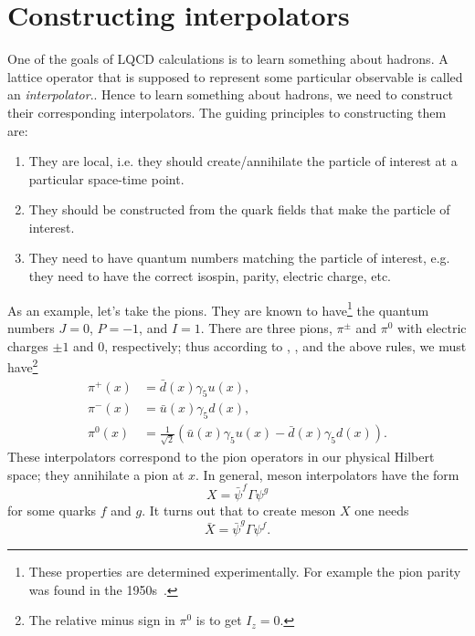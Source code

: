 \section{Constructing interpolators}

One of the goals of LQCD calculations is to learn something about hadrons. A
lattice operator that is supposed to represent some particular observable is
called an {\it interpolator}.. Hence to learn something
about hadrons, we need to construct their corresponding interpolators. The
guiding principles to constructing them are:
\begin{enumerate}
  \item They are local, i.e. they should create/annihilate the particle of
        interest at a particular space-time point.
  \item They should be constructed from the quark fields that make the particle
        of interest.
  \item They need to have quantum numbers matching the particle of interest,
        e.g. they need to have the correct isospin, parity, electric charge,
        etc.
\end{enumerate} 

As an example, let's take the pions. They are known to
have\footnote{These properties are determined experimentally. For
example the pion parity was found in the 1950s~\cite{chinowsky_reaction_1955}.} 
the quantum numbers $J=0$, $P=-1$, and $I=1$. There are three
pions, $\pi^{\pm}$ and $\pi^0$ with electric charges $\pm1$ and 0,
respectively; thus according to ,
, and the above rules, we must have\footnote{The relative
minus sign in $\pi^0$ is to get $I_z=0$.}
\begin{equation}\begin{aligned}
  \pi^+(x) &= \bar{d}(x)\gamma_5u(x),\\
  \pi^-(x) &= \bar{u}(x)\gamma_5d(x),\\
  \pi^0(x) &= \frac{1}{\sqrt{2}}\left( \bar{u}(x)\gamma_5u(x)
                                      -\bar{d}(x)\gamma_5d(x)\right).
\end{aligned}\end{equation}
These interpolators correspond to the pion operators in our physical Hilbert
space; they annihilate a pion at $x$. In general, meson interpolators have the
form
\begin{equation}\label{eq:mesonInterp}
 X=\bar{\psi}^f\Gamma\psi^g
\end{equation}
for some quarks $f$ and $g$. It turns out that to create meson $X$ one needs
\begin{equation}\label{eq:mesonInterp}
 \bar{X}=\bar{\psi}^g\Gamma\psi^f.
\end{equation}


